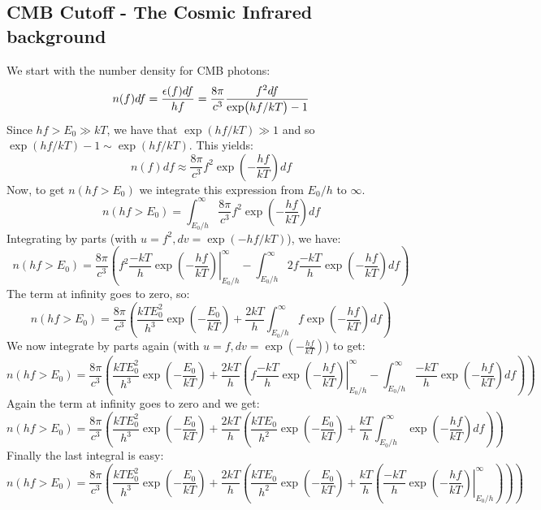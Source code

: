 \subsection{CMB Cutoff - The Cosmic Infrared background}
We start with the number density for CMB photons:
\begin{equation}
  n(f)df = \frac{\epsilon(f)df}{hf} = \frac{8\pi}{c^3}\frac{f^2df}{\exp(hf/kT) - 1}
\end{equation}
Since $hf > E_0 \gg kT$, we have that $\exp(hf/kT) \gg 1$ and so $\exp(hf/kT) -1 \sim \exp(hf/kT)$. This yields:
\begin{equation}
  n(f)df \approx \frac{8\pi}{c^3}f^2\exp(-\frac{hf}{kT})df
\end{equation}
Now, to get $n(hf > E_0)$ we integrate this expression from $E_0/h$ to $\infty$.
\begin{equation}
  n(hf > E_0) = \int_{E_0/h}^\infty \frac{8\pi}{c^3}f^2\exp(-\frac{hf}{kT})df
\end{equation}
Integrating by parts (with $u = f^2, dv = \exp(-hf/kT)$), we have:
\begin{equation}
  n(hf > E_0) = \frac{8\pi}{c^3}\left(\left.f^2\frac{-kT}{h}\exp(-\frac{hf}{kT})\right|_{E_0/h}^\infty - \int_{E_0/h}^\infty 2f\frac{-kT}{h}\exp(-\frac{hf}{kT})df\right)
\end{equation}
The term at infinity goes to zero, so:
\begin{equation}
  n(hf > E_0) = \frac{8\pi}{c^3}\left(\frac{kTE_0^2}{h^3}\exp(-\frac{E_0}{kT})+ \frac{2kT}{h}\int_{E_0/h}^\infty f\exp(-\frac{hf}{kT})df\right)
\end{equation}
We now integrate by parts again (with $u = f, dv = \exp(-\frac{hf}{kT})$) to get:
\begin{equation}
  n(hf > E_0) = \frac{8\pi}{c^3}\left(\frac{kTE_0^2}{h^3}\exp(-\frac{E_0}{kT})+ \frac{2kT}{h}\left(\left.f\frac{-kT}{h}\exp(-\frac{hf}{kT})\right|_{E_0/h}^\infty - \int_{E_0/h}^\infty \frac{-kT}{h}\exp(-\frac{hf}{kT})df\right)\right)
\end{equation}
Again the term at infinity goes to zero and we get:
\begin{equation}
  n(hf > E_0) = \frac{8\pi}{c^3}\left(\frac{kTE_0^2}{h^3}\exp(-\frac{E_0}{kT})+ \frac{2kT}{h}\left(\frac{kTE_0}{h^2}\exp(-\frac{E_0}{kT}) + \frac{kT}{h}\int_{E_0/h}^\infty\exp(-\frac{hf}{kT})df\right)\right)
\end{equation}
Finally the last integral is easy:
\begin{equation}
  n(hf > E_0) = \frac{8\pi}{c^3}\left(\frac{kTE_0^2}{h^3}\exp(-\frac{E_0}{kT})+ \frac{2kT}{h}\left(\frac{kTE_0}{h^2}\exp(-\frac{E_0}{kT}) + \frac{kT}{h}\left(\left.\frac{-kT}{h}\exp(-\frac{hf}{kT})\right|_{E_0/h}^\infty\right)\right)\right)
\end{equation}
